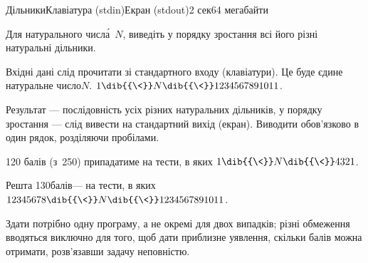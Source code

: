 \begin{problem}{Дільники}{Клавіатура (stdin)}{Екран (stdout)}{2 сек}{64 мегабайти}

Для натурального числ\'{а}~$N$, виведіть у порядку зростання всі його різні натуральні дільники.

\InputFile Вхідні дані слід прочитати зі стандартного входу (клавіатури). Це буде єдине натуральне число\nolinebreak[3] $N$. $1\dib{{\<}}N\dib{{\<}}1234567891011$.

\OutputFile	Результат --- послідовність усіх різних натуральних дільників, у порядку зростання --- слід вивести на стандартний вихід (екран). Виводити обов’язково в один рядок, розділяючи пробілами.

\ifAfour\vspace{-0.75\baselineskip}\fi

\Examples\hspace*{-0.5em}
\begin{exampleSimple}{5em}{21em}%
%
%
\end{exampleSimple}

120 балів (з~250) припадатиме на тести, в яких $1\dib{{\<}}N\dib{{\<}}4321$.

Решта 130\nolinebreak[3] балів\nolinebreak[3] --- на тести, в яких $12345678\dib{{\<}}N\dib{{\<}}1234567891011$.

Здати потрібно одну програму, а не окремі для двох випадків; різні обмеження вводяться виключно для того, щоб дати приблизне уявлення, скільки балів можна отримати, розв’язавши задачу не\nolinebreak[3] повністю.

\end{problem}